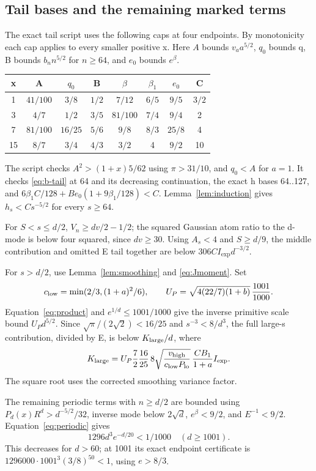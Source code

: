 \documentclass[11pt]{article}
\theoremstyle{remark}\newtheorem{remark}[theorem]{Remark}
\begin{document}
\subsection{Tail bases and the remaining marked terms}
The exact tail script uses the following caps at four endpoints.
By monotonicity each cap applies to every smaller positive x.
Here $A$ bounds $v_a a^{5/2}$, $q_0$ bounds q, B bounds
$b_nn^{5/2}$ for $n\ge64$, and $e_0$ bounds $e^\beta$.
\begin{center}\small
\begin{tabular}{c c c c c c c c}
\toprule
x&A&$q_0$&B&$\beta$&$\beta_1$&$e_0$&C\\\midrule
1&$41/100$&$3/8$&$1/2$&$7/12$&$6/5$&$9/5$&$3/2$\\
3&$4/7$&$1/2$&$3/5$&$81/100$&$7/4$&$9/4$&2\\
7&$81/100$&$16/25$&$5/6$&$9/8$&$8/3$&$25/8$&4\\
15&$8/7$&$3/4$&$4/3$&$3/2$&4&$9/2$&10\\\bottomrule
\end{tabular}
\end{center}
The script checks $A^2>(1+x)5/62$ using $\pi>31/10$, and $q_0<A$ for
$a=1$. It checks \eqref{eq:b-tail} at 64 and its decreasing continuation,
the exact h bases 64..127, and
$6\beta_1C/128+Be_0(1+9\beta_1/128)<C$.
Lemma~\ref{lem:induction} gives $h_s<Cs^{-5/2}$ for every $s\ge64$.

For $S<s\le d/2$, $V_n\ge dv/2-1/2$; the squared Gaussian atom ratio
to the d-mode is below four squared, since $dv\ge30$.
Using $A_s<4$ and $S\ge d/9$, the middle contribution and omitted E tail
together are below $306CI_{\exp}d^{-3/2}$.

For $s>d/2$, use Lemma~\ref{lem:smoothing} and \eqref{eq:Jmoment}.
Set
\[
 c_{\rm low}=\min(2/3,(1+a)^2/6),\qquad
 U_P=\sqrt{4(22/7)(1+b)}\,\frac{1001}{1000}.
\]
Equation~\eqref{eq:product} and $e^{1/d}\le1001/1000$ give the inverse
primitive scale bound $U_Pd^{5/2}$.
Since $\sqrt\pi/(2\sqrt2)<16/25$ and $s^{-3}<8/d^3$, the full large-s
contribution, divided by E, is below $K_{\rm large}/d$, where
\[
 K_{\rm large}=U_P\frac72\frac{16}{25}\,8
 \sqrt{\frac{v_{\rm high}}{c_{\rm low}P_{\rm lo}}}\,
                  \frac{CB_1}{1+a}I_{\exp}.
\]
The square root uses the corrected smoothing variance factor.

The remaining periodic terms with $n\ge d/2$ are bounded using
$P_d(x)R^d>d^{-5/2}/32$, inverse mode below $2\sqrt d$,
$e^\beta<9/2$, and $E^{-1}<9/2$.
Equation~\eqref{eq:periodic} gives
\[
 1296d^3e^{-d/20}<1/1000\quad(d\ge1001).
\]
This decreases for $d>60$; at 1001 its exact endpoint certificate is
$1296000\cdot1001^3(3/8)^{50}<1$, using $e>8/3$.
\end{document}
